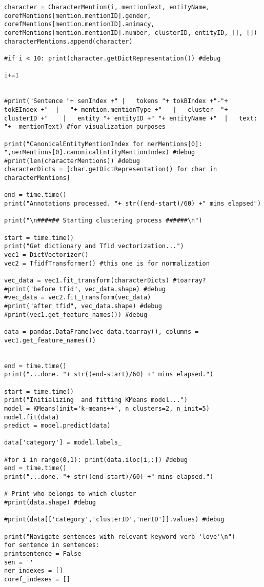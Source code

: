 \documentclass{pre-tfg}
\begin{document}
\begin{lstlisting}[style=consola]
character = CharacterMention(i, mentionText, entityName, corefMentions[mention.mentionID].gender, corefMentions[mention.mentionID].animacy, corefMentions[mention.mentionID].number, clusterID, entityID, [], [])
characterMentions.append(character)

#if i < 10: print(character.getDictRepresentation()) #debug

i+=1


#print("Sentence "+ senIndex +"	|	tokens "+ tokBIndex +"-"+ tokEIndex +"	|	"+ mention.mentionType +"	|	cluster  "+ clusterID +"	|	entity "+ entityID +" "+ entityName +"	|	text: "+  mentionText) #for visualization purposes

print("CanonicalEntityMentionIndex for nerMentions[0]: ",nerMentions[0].canonicalEntityMentionIndex) #debug
#print(len(characterMentions)) #debug
characterDicts = [char.getDictRepresentation() for char in characterMentions]

end = time.time()
print("Annotations processed. "+ str((end-start)/60) +" mins elapsed")

print("\n###### Starting clustering process ######\n")

start = time.time()
print("Get dictionary and Tfid vectorization...")
vec1 = DictVectorizer()
vec2 = TfidfTransformer() #this one is for normalization

vec_data = vec1.fit_transform(characterDicts) #toarray?
#print("before tfid", vec_data.shape) #debug
#vec_data = vec2.fit_transform(vec_data)
#print("after tfid", vec_data.shape) #debug
#print(vec1.get_feature_names()) #debug

data = pandas.DataFrame(vec_data.toarray(), columns = vec1.get_feature_names())


end = time.time()
print("...done. "+ str((end-start)/60) +" mins elapsed.")

start = time.time()
print("Initializing  and fitting KMeans model...")
model = KMeans(init='k-means++', n_clusters=2, n_init=5)
model.fit(data)
predict = model.predict(data)

data['category'] = model.labels_

#for i in range(0,1): print(data.iloc[i,:]) #debug
end = time.time()
print("...done. "+ str((end-start)/60) +" mins elapsed.")

# Print who belongs to which cluster
#print(data.shape) #debug

#print(data[['category','clusterID','nerID']].values) #debug

print("Navigate sentences with relevant keyword verb 'love'\n")
for sentence in sentences:
printsentence = False
sen = ''
ner_indexes = []
coref_indexes = []


\end{lstlisting}
\end{document}
